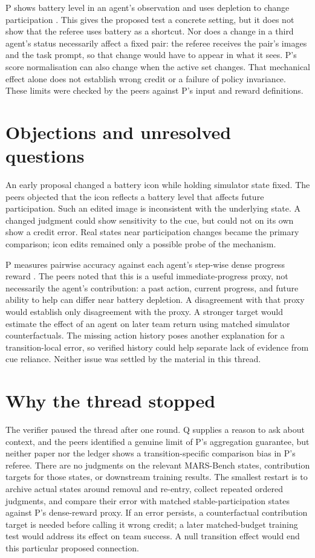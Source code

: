 \documentclass{article}
\begin{document}
P shows battery level in an agent's observation and uses depletion to change participation \cite{P}. This gives the proposed test a concrete setting, but it does not show that the referee uses battery as a shortcut. Nor does a change in a third agent's status necessarily affect a fixed pair: the referee receives the pair's images and the task prompt, so that change would have to appear in what it sees. P's score normalisation can also change when the active set changes. That mechanical effect alone does not establish wrong credit or a failure of policy invariance. These limits were checked by the peers against P's input and reward definitions.

\section{Objections and unresolved questions}

An early proposal changed a battery icon while holding simulator state fixed. The peers objected that the icon reflects a battery level that affects future participation. Such an edited image is inconsistent with the underlying state. A changed judgment could show sensitivity to the cue, but could not on its own show a credit error. Real states near participation changes became the primary comparison; icon edits remained only a possible probe of the mechanism.

P measures pairwise accuracy against each agent's step-wise dense progress reward \cite{P}. The peers noted that this is a useful immediate-progress proxy, not necessarily the agent's contribution: a past action, current progress, and future ability to help can differ near battery depletion. A disagreement with that proxy would establish only disagreement with the proxy. A stronger target would estimate the effect of an agent on later team return using matched simulator counterfactuals. The missing action history poses another explanation for a transition-local error, so verified history could help separate lack of evidence from cue reliance. Neither issue was settled by the material in this thread.

\section{Why the thread stopped}

The verifier paused the thread after one round. Q supplies a reason to ask about context, and the peers identified a genuine limit of P's aggregation guarantee, but neither paper nor the ledger shows a transition-specific comparison bias in P's referee. There are no judgments on the relevant MARS-Bench states, contribution targets for those states, or downstream training results. The smallest restart is to archive actual states around removal and re-entry, collect repeated ordered judgments, and compare their error with matched stable-participation states against P's dense-reward proxy. If an error persists, a counterfactual contribution target is needed before calling it wrong credit; a later matched-budget training test would address its effect on team success. A null transition effect would end this particular proposed connection.

\enlargethispage{2\baselineskip}


\end{document}
